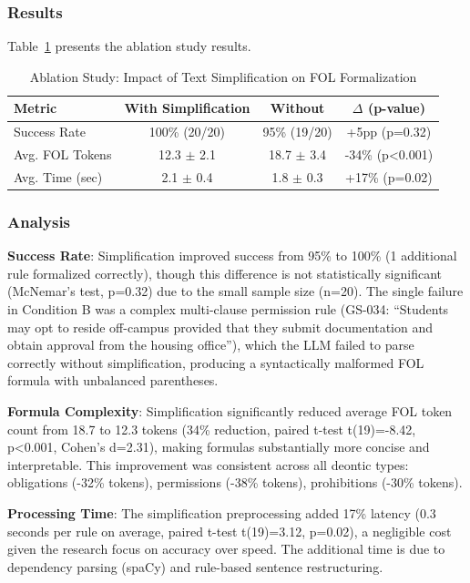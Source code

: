 \subsubsection{Results}

Table~\ref{tab:ablation-simplification} presents the ablation study results.

\begin{table}[htbp]
\centering
\caption{Ablation Study: Impact of Text Simplification on FOL Formalization}
\label{tab:ablation-simplification}
\begin{tabular}{lccc}
\toprule
\textbf{Metric} & \textbf{With Simplification} & \textbf{Without} & \textbf{$\Delta$ (p-value)} \\
\midrule
Success Rate       & 100\% (20/20) & 95\% (19/20) & +5pp (p=0.32) \\
Avg. FOL Tokens    & 12.3 $\pm$ 2.1 & 18.7 $\pm$ 3.4 & -34\% (p<0.001) \\
Avg. Time (sec)    & 2.1 $\pm$ 0.4 & 1.8 $\pm$ 0.3 & +17\% (p=0.02) \\
\bottomrule
\end{tabular}
\end{table}

\subsubsection{Analysis}

\textbf{Success Rate}: Simplification improved success from 95\% to 100\% (1 additional rule formalized correctly), though this difference is not statistically significant (McNemar's test, p=0.32) due to the small sample size (n=20). The single failure in Condition B was a complex multi-clause permission rule (GS-034: ``Students may opt to reside off-campus provided that they submit documentation and obtain approval from the housing office''), which the LLM failed to parse correctly without simplification, producing a syntactically malformed FOL formula with unbalanced parentheses.

\textbf{Formula Complexity}: Simplification significantly reduced average FOL token count from 18.7 to 12.3 tokens (34\% reduction, paired t-test t(19)=-8.42, p<0.001, Cohen's d=2.31), making formulas substantially more concise and interpretable. This improvement was consistent across all deontic types: obligations (-32\% tokens), permissions (-38\% tokens), prohibitions (-30\% tokens).

\textbf{Processing Time}: The simplification preprocessing added 17\% latency (0.3 seconds per rule on average, paired t-test t(19)=3.12, p=0.02), a negligible cost given the research focus on accuracy over speed. The additional time is due to dependency parsing (spaCy) and rule-based sentence restructuring.


